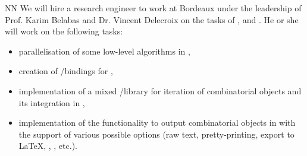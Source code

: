 \begin{participant}[type=R, PM=48]{NN}
We will hire a research engineer to work at Bordeaux
 under the leadership of Prof. Karim Belabas and Dr. Vincent
Delecroix on the tasks of ,  and .
He or she will work on the following tasks:
\begin{itemize}
\item parallelisation of some low-level algorithms in \PariGP,
\item creation of \Cython/\Python bindings for \PariGP,
\item implementation of a mixed /\Python library for iteration of combinatorial
objects and its integration in \Sage,
\item implementation of the functionality to output combinatorial objects in \Sage
with the support of various possible options (raw text, pretty-printing, export to 
\LaTeX, , , etc.).
\end{itemize}
\end{participant}
